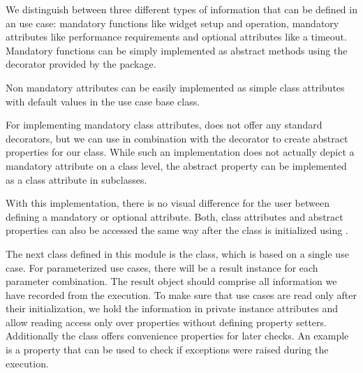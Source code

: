 We distinguish between three different types of information that can be defined
in an use case: mandatory functions like widget setup and operation, mandatory
attributes like performance requirements and optional attributes like a timeout.
Mandatory functions can be simply implemented as abstract methods using the
 decorator provided by the
 package.



Non mandatory attributes can be easily implemented as simple class attributes
with default values in the use case base class.



For implementing mandatory class attributes,  does not
offer any standard decorators, but we can use  in
combination with the  decorator to create
abstract properties for our class. While such an implementation does not
actually depict a mandatory attribute on a class level, the abstract property
can be implemented as a class attribute in subclasses.





With this implementation, there is no visual difference for the user between
defining a mandatory or optional attribute. Both, class attributes and abstract
properties can also be accessed the same way after the class is initialized
using .

The next class defined in this module is the 
class, which is based on a single use case. For parameterized use cases, there
will be a result instance for each parameter combination. The result object
should comprise all information we have recorded from the execution. To make
sure that use cases are read only after their initialization, we hold the
information in private instance attributes and allow reading access only over
properties without defining property setters. Additionally the class offers
convenience properties for later checks.  An example is a
 property that can be used to check if exceptions
were raised during the execution.

